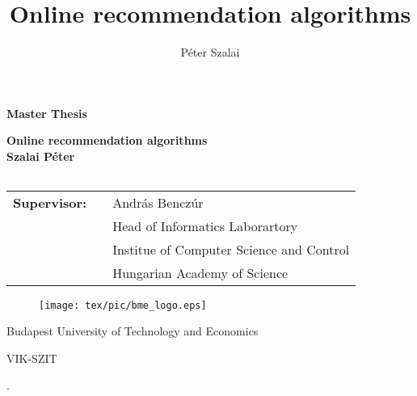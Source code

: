 \documentclass[a4paper,11pt,oneside,usenames,dvipsnames]{report}
\title{Online recommendation algorithms}
\author{P\'eter Szalai}
\begin{document}

\thispagestyle{empty}
\begin{center}

{ $\left. \right.$ \\ \vspace{0.5cm} \large \textbf{Master Thesis} \\ }
\vspace{2cm}

{ \large \textbf{Online recommendation algorithms} \\
\vspace{1cm}  
\textbf{Szalai P\'eter} \\ }
\vspace{2cm}

\begin{tabular}{c}

\end{tabular}

\begin{tabular}{l l l }
 {\bf Supervisor:} && Andr\'as Bencz\'ur  \\
                    && Head of Informatics Laborartory \\
                    && Institue of Computer Science and Control\\
                    && Hungarian Academy of Science
                    
\end{tabular}

\vspace*{2cm}


\begin{figure}[h]
\centering
\texttt{[image: tex/pic/bme\_logo.eps]}
\end{figure}
\vspace*{-.25cm}
\begin{center}
{\normalsize \rmfamily Budapest University of Technology and Economics}
\end{center}
\vspace*{-.5cm}
\begin{center}
{\normalsize \rmfamily VIK-SZIT}
\end{center}

\begin{center}
{\normalsize {}.}
\end{center} 

\end{center}
\newpage

\tableofcontents
{}

\setcounter{page}{1}







\newpage


\end{document}
